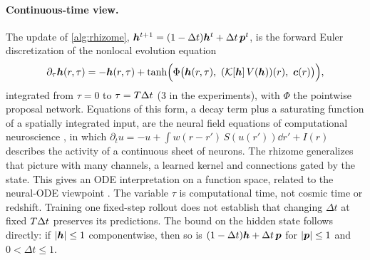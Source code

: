 \paragraph{Continuous-time view.} The update of \cref{alg:rhizome}, $\bm{h}^{t+1}=(1-\Delta t)\bm{h}^t+\Delta t\,\bm p^t$, is the forward Euler discretization of the nonlocal evolution equation
\begin{equation}
  \label{eq:rhizome-ode}
  \partial_\tau \h(r,\tau) = -\h(r,\tau) + \tanh\!\Big(\Phi\big(\h(r,\tau),\ (\Kop[\h]\,V(\h))(r),\ \cond(r)\big)\Big),
\end{equation}
integrated from $\tau=0$ to $\tau=T\Delta t$ (3 in the experiments), with $\Phi$ the pointwise proposal network. Equations of this form, a decay term plus a saturating function of a spatially integrated input, are the neural field equations of computational neuroscience \citep{amari1977dynamics}, in which $\partial_t u=-u+\int w(r-r')\,S(u(r'))\dd r'+I(r)$ describes the activity of a continuous sheet of neurons. The rhizome generalizes that picture with many channels, a learned kernel and connections gated by the state. This gives an ODE interpretation on a function space, related to the neural-ODE viewpoint \citep{chen2018neural}. The variable $\tau$ is computational time, not cosmic time or redshift. Training one fixed-step rollout does not establish that changing $\Delta t$ at fixed $T\Delta t$ preserves its predictions. The bound on the hidden state follows directly: if $\lvert\bm{h}\rvert\le1$ componentwise, then so is $(1-\Delta t)\bm{h}+\Delta t\,\bm p$ for $\lvert\bm p\rvert\le1$ and $0<\Delta t\le1$.

